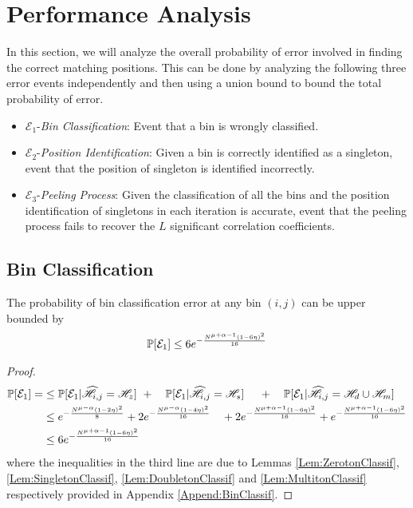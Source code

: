 \section{Performance Analysis}
\label{sec:analysis}
\def\vgap{2pt}
In this section, we will analyze the overall probability of error involved in finding the correct matching positions. This can be done by analyzing the following three error events independently and then using a union bound to bound the total probability of error.

\begin{itemize}
	\item $\mathcal{E}_1${-\it Bin Classification}: Event that a bin is wrongly classified.
	\item $\mathcal{E}_2${-\it Position Identification}: Given a bin is correctly identified as a singleton, event that the position of singleton is identified incorrectly.
	\item $\mathcal{E}_3${-\it Peeling Process}: Given the classification of all the bins and the position identification of singletons in each iteration is accurate, event that the peeling process fails to recover the $L$ significant correlation coefficients.
\end{itemize}

\subsection{\bf Bin Classification}
\begin{lemma}
The probability of bin classification error at any bin $(i,j)$ can be upper bounded by
\begin{align*}
\mathbb{P}[\mathcal{E}_1]\leq 6e^{-\frac{N^{\mu+\alpha-1}(1-6\eta)^2}{16}}
\end{align*} \label{Lem:binclassification}
\end{lemma}
\begin{proof}
\begin{align*}
\mathbb{P}[\mathcal{E}_1] =& \leq \mathbb{P}[\mathcal{E}_1|\widehat{\mathscr{H}}_{i,j}=\mathscr{H}_z]~+
						\quad \mathbb{P}[\mathcal{E}_1|\widehat{\mathscr{H}}_{i,j}=\mathscr{H}_s]~ \quad + \quad \mathbb{P}[\mathcal{E}_1|\widehat{\mathscr{H}}_{i,j}=\mathscr{H}_d \cup \mathscr{H}_m]\\
    			&\leq  e^{-\frac{N^{\mu-\alpha}(1-2\eta)^2}{8}}+2e^{-\frac{N^{\mu-\alpha}(1-4\eta)^2}{16}} \quad + 2e^{-\frac{N^{\mu+\alpha-1}(1-6\eta)^2}{16}}+e^{-\frac{N^{\mu+\alpha-1}(1-6\eta)^2}{16}}\\
    			&\leq 6e^{-\frac{N^{\mu+\alpha-1}(1-6\eta)^2}{16}}\\
 \end{align*}
{where the inequalities in the third line are due to Lemmas \ref{Lem:ZerotonClassif}, \ref{Lem:SingletonClassif}, \ref{Lem:DoubletonClassif} and \ref{Lem:MultitonClassif} respectively provided in Appendix \ref{Append:BinClassif}.}
\end{proof}

